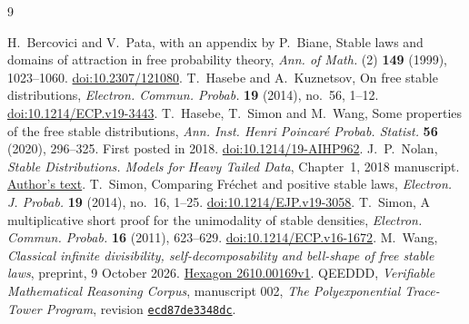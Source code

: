 \documentclass[11pt,a4paper]{article}
\numberwithin{equation}{section}
\begin{document}
\begin{thebibliography}{9}\raggedright
{} H.~Bercovici and V.~Pata, with an appendix by P.~Biane,
Stable laws and domains of attraction in free probability theory,
\emph{Ann. of Math.} (2) \textbf{149} (1999), 1023--1060.
\href{https://doi.org/10.2307/121080}{doi:10.2307/121080}.
 T.~Hasebe and A.~Kuznetsov, On free stable distributions,
\emph{Electron. Commun. Probab.} \textbf{19} (2014), no.~56, 1--12.
\href{https://doi.org/10.1214/ECP.v19-3443}{doi:10.1214/ECP.v19-3443}.
 T.~Hasebe, T.~Simon and M.~Wang, Some properties of the
free stable distributions, \emph{Ann. Inst. Henri Poincar\'e Probab.
Statist.} \textbf{56} (2020), 296--325. First posted in 2018.
\href{https://doi.org/10.1214/19-AIHP962}{doi:10.1214/19-AIHP962}.
 J.~P.~Nolan, \emph{Stable Distributions. Models for
Heavy Tailed Data}, Chapter~1, 2018 manuscript.
\href{https://edspace.american.edu/jpnolan/wp-content/uploads/sites/1720/2020/09/Chap1.pdf}{Author's text}.
 T.~Simon, Comparing Fr\'echet and positive stable laws,
\emph{Electron. J. Probab.} \textbf{19} (2014), no.~16, 1--25.
\href{https://doi.org/10.1214/EJP.v19-3058}{doi:10.1214/EJP.v19-3058}.
 T.~Simon, A multiplicative short proof for the unimodality
of stable densities, \emph{Electron. Commun. Probab.} \textbf{16}
(2011), 623--629.
\href{https://doi.org/10.1214/ECP.v16-1672}{doi:10.1214/ECP.v16-1672}.
 M.~Wang, \emph{Classical infinite divisibility,
self-decomposability and bell-shape of free stable laws},
preprint, 9 October 2026.
\href{https://hexagonmath.org/pdf/2610.00169v1}{Hexagon 2610.00169v1}.
 QEEDDD, \emph{Verifiable Mathematical Reasoning
Corpus}, manuscript 002, \emph{The Polyexponential Trace-Tower Program},
revision \href{https://github.com/QEEDDD/Verifiable-Mathematical-Reasoning-Corpus/tree/ecd87de3348dcb706a76bb12fde722d7a348a012}{\texttt{ecd87de3348dc}}.
\end{thebibliography}
\end{document}
